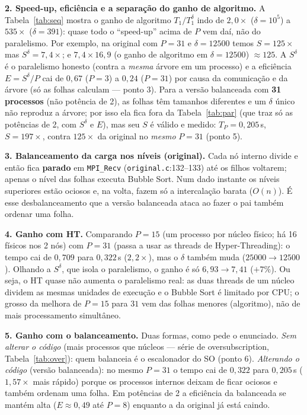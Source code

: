 \documentclass[10pt]{article}
\newcommand{\sd}{\ensuremath{S^{\delta}}}
\begin{document}
\textbf{2. Speed-up, eficiência e a separação do ganho de algoritmo.}
A Tabela~\ref{tab:seq} mostra o ganho de algoritmo $T_1/T_1^{\delta}$ indo de $2{,}0\times$ ($\delta{=}10^5$)
a $535\times$ ($\delta{=}391$): quase todo o ``speed-up'' acima de $P$ vem daí, não do paralelismo.
Por exemplo, na original com $P{=}31$ e $\delta{=}12500$ temos $S=125\times$ mas \sd${}=7{,}4\times$; e
$7{,}4 \times 16{,}9$ (o ganho de algoritmo em $\delta{=}12500$) $\approx 125$. A \sd{} é o paralelismo
honesto (contra a \emph{mesma} árvore em um processo) e a eficiência $E=\sd/P$ cai de $0{,}67$ ($P{=}3$) a
$0{,}24$ ($P{=}31$) por causa da comunicação e da árvore (só as folhas calculam --- ponto 3).
Para a versão balanceada com \textbf{31 processos} (não potência de 2), as folhas têm tamanhos diferentes
e um $\delta$ único não reproduz a árvore; por isso ela fica fora da Tabela~\ref{tab:par} (que traz só as
potências de 2, com \sd{} e $E$), mas seu $S$ é válido e medido: $T_P=0{,}205$\,s, $S=197\times$, contra
$125\times$ da original no \emph{mesmo} $P{=}31$ (ponto 5).

\textbf{3. Balanceamento da carga nos níveis (original).}
Cada nó interno divide e então fica \textbf{parado} em \texttt{MPI\_Recv} (\texttt{original.c}:132--133)
até os filhos voltarem; apenas o nível das folhas executa Bubble Sort. Num dado instante os níveis
superiores estão ociosos e, na volta, fazem só a intercalação barata ($O(n)$). É esse desbalanceamento
que a versão balanceada ataca ao fazer o pai também ordenar uma folha.

\textbf{4. Ganho com HT.}
Comparando $P{=}15$ (um processo por núcleo físico; há 16 físicos nos 2 nós) com $P{=}31$ (passa a usar as
threads de Hyper-Threading): o tempo cai de $0{,}709$ para $0{,}322$\,s ($2{,}2\times$), mas o $\delta$
também muda ($25000\!\to\!12500$). Olhando a \sd{}, que isola o paralelismo, o ganho é só
$6{,}93\!\to\!7{,}41$ ($+7\%$). Ou seja, o HT quase não aumenta o paralelismo real: as duas threads de um
núcleo dividem as mesmas unidades de execução e o Bubble Sort é limitado por CPU; o grosso da melhora de
$P{=}15$ para $31$ vem das folhas menores (algoritmo), não de mais processamento simultâneo.

\textbf{5. Ganho com o balanceamento.}
Duas formas, como pede o enunciado. \emph{Sem alterar o código} (mais processos que núcleos --- série de
oversubscription, Tabela~\ref{tab:over}): quem balanceia é o escalonador do SO (ponto 6).
\emph{Alterando o código} (versão balanceada): no mesmo $P{=}31$ o tempo cai de $0{,}322$ para
$0{,}205$\,s ($1{,}57\times$ mais rápido) porque os processos internos deixam de ficar ociosos e também
ordenam uma folha. Em potências de 2 a eficiência da balanceada se mantém alta ($E\approx0{,}49$ até
$P{=}8$) enquanto a da original já está caindo.
\end{document}

